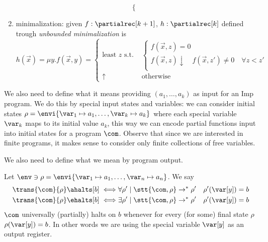 \begin{definition}
\begin{enumerate}[label=(\arabic*)]
\begin{equation*}
\begin{cases}
      \end{cases}
    \end{equation*}
  \item\label{parec:3} minimalization: given \(f : \partialrec[k+1]\),
    \(h : \partialrec[k]\) defined trough \emph{unbounded
      minimalization} is
    \begin{equation*}
      h(\vec{x}) = \mu y . f(\vec{x}, y) = \begin{cases}
        \text{least } z \text{ s.t. } & \begin{cases}
          f(\vec{x}, z) = 0 \\
	  f(\vec{x}, z) \downarrow \quad f(\vec{x},z')\neq 0 \quad \forall z < z' \\
	\end{cases} \\
        \uparrow                      & \text{otherwise}
      \end{cases}
    \end{equation*}
  \end{enumerate}
\end{definition}
\noindent
We also need to define what it means providing \((a_1, \dots, a_k)\)
as input for an Imp program. We do this by special input states and
variables: we can consider initial states
\(\rho = \envi{\var_1 \mapsto a_1, \dots, \var_k \mapsto a_k}\) where
each special variable \(\var_k\) maps to its initial value \(a_k\),
this way we can encode partial functions input into initial states for
a program \(\com\). Observe that since we are interested in finite
programs, it makes sense to consider only finite collections of free
variables.

We also need to define what we mean by program output.
\begin{notation}
  Let \(\env \ni \rho = \envi{\var_1\mapsto a_1, \dots, \var_n \mapsto
    a_n}\). We say
  \begin{align*}
    \trans{\com}{\rho}\ahalts[b] \iff & \forall \rho' \mid \stt{\com, \rho} \to^* \rho' \quad \rho'(\var[y]) = b \\
    \trans{\com}{\rho}\ehalts[b] \iff & \exists \rho' \mid \stt{\com, \rho} \to^* \rho' \quad \rho'(\var[y]) = b
  \end{align*}
  \(\com\) universally (partially) halts on \(b\) whenever for every
  (for some) final state \(\rho\) \(\rho(\var[y]) = b\). In other
  words we are using the special variable \(\var[y]\) as an output
  register.
\end{notation}

